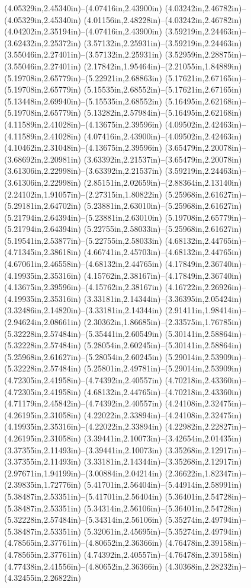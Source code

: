 (4.05329in,2.45340in)--(4.07416in,2.43900in) (4.03242in,2.46782in)--(4.05329in,2.45340in) (4.01156in,2.48228in)--(4.03242in,2.46782in) (4.04202in,2.35194in)--(4.07416in,2.43900in) (3.59219in,2.24463in)--(3.62432in,2.25372in) (3.57132in,2.25931in)--(3.59219in,2.24463in) (3.55046in,2.27401in)--(3.57132in,2.25931in) (3.52959in,2.28875in)--(3.55046in,2.27401in) (2.17842in,1.95464in)--(2.21055in,1.84889in) (5.19708in,2.65779in)--(5.22921in,2.68863in) (5.17621in,2.67165in)--(5.19708in,2.65779in) (5.15535in,2.68552in)--(5.17621in,2.67165in) (5.13448in,2.69940in)--(5.15535in,2.68552in) (5.16495in,2.62168in)--(5.19708in,2.65779in) (5.13282in,2.57984in)--(5.16495in,2.62168in) (4.11589in,2.41028in)--(4.13675in,2.39596in) (4.09502in,2.42463in)--(4.11589in,2.41028in) (4.07416in,2.43900in)--(4.09502in,2.42463in) (4.10462in,2.31048in)--(4.13675in,2.39596in) (3.65479in,2.20078in)--(3.68692in,2.20981in) (3.63392in,2.21537in)--(3.65479in,2.20078in) (3.61306in,2.22998in)--(3.63392in,2.21537in) (3.59219in,2.24463in)--(3.61306in,2.22998in) (2.85151in,2.02659in)--(2.88364in,2.13140in) (2.24102in,1.91057in)--(2.27315in,1.80822in) (5.25968in,2.61627in)--(5.29181in,2.64702in) (5.23881in,2.63010in)--(5.25968in,2.61627in) (5.21794in,2.64394in)--(5.23881in,2.63010in) (5.19708in,2.65779in)--(5.21794in,2.64394in) (5.22755in,2.58033in)--(5.25968in,2.61627in) (5.19541in,2.53877in)--(5.22755in,2.58033in) (4.68132in,2.44765in)--(4.71345in,2.38618in) (4.66741in,2.45703in)--(4.68132in,2.44765in) (4.67061in,2.46558in)--(4.68132in,2.44765in) (4.17849in,2.36740in)--(4.19935in,2.35316in) (4.15762in,2.38167in)--(4.17849in,2.36740in) (4.13675in,2.39596in)--(4.15762in,2.38167in) (4.16722in,2.26926in)--(4.19935in,2.35316in) (3.33181in,2.14344in)--(3.36395in,2.05424in) (3.32486in,2.14820in)--(3.33181in,2.14344in) (2.91411in,1.98414in)--(2.94624in,2.08661in) (2.30362in,1.86685in)--(2.33575in,1.76785in) (5.32228in,2.57484in)--(5.35441in,2.60549in) (5.30141in,2.58864in)--(5.32228in,2.57484in) (5.28054in,2.60245in)--(5.30141in,2.58864in) (5.25968in,2.61627in)--(5.28054in,2.60245in) (5.29014in,2.53909in)--(5.32228in,2.57484in) (5.25801in,2.49781in)--(5.29014in,2.53909in) (4.72305in,2.41958in)--(4.74392in,2.40557in) (4.70218in,2.43360in)--(4.72305in,2.41958in) (4.68132in,2.44765in)--(4.70218in,2.43360in) (4.71179in,2.45842in)--(4.74392in,2.40557in) (4.24108in,2.32475in)--(4.26195in,2.31058in) (4.22022in,2.33894in)--(4.24108in,2.32475in) (4.19935in,2.35316in)--(4.22022in,2.33894in) (4.22982in,2.22827in)--(4.26195in,2.31058in) (3.39441in,2.10073in)--(3.42654in,2.01435in) (3.37355in,2.11493in)--(3.39441in,2.10073in) (3.35268in,2.12917in)--(3.37355in,2.11493in) (3.33181in,2.14344in)--(3.35268in,2.12917in) (2.97671in,1.94199in)--(3.00884in,2.04214in) (2.36622in,1.82347in)--(2.39835in,1.72776in) (5.41701in,2.56404in)--(5.44914in,2.58991in) (5.38487in,2.53351in)--(5.41701in,2.56404in) (5.36401in,2.54728in)--(5.38487in,2.53351in) (5.34314in,2.56106in)--(5.36401in,2.54728in) (5.32228in,2.57484in)--(5.34314in,2.56106in) (5.35274in,2.49794in)--(5.38487in,2.53351in) (5.32061in,2.45695in)--(5.35274in,2.49794in) (4.78565in,2.37761in)--(4.80652in,2.36366in) (4.76478in,2.39158in)--(4.78565in,2.37761in) (4.74392in,2.40557in)--(4.76478in,2.39158in) (4.77438in,2.41556in)--(4.80652in,2.36366in) (4.30368in,2.28232in)--(4.32455in,2.26822in) 